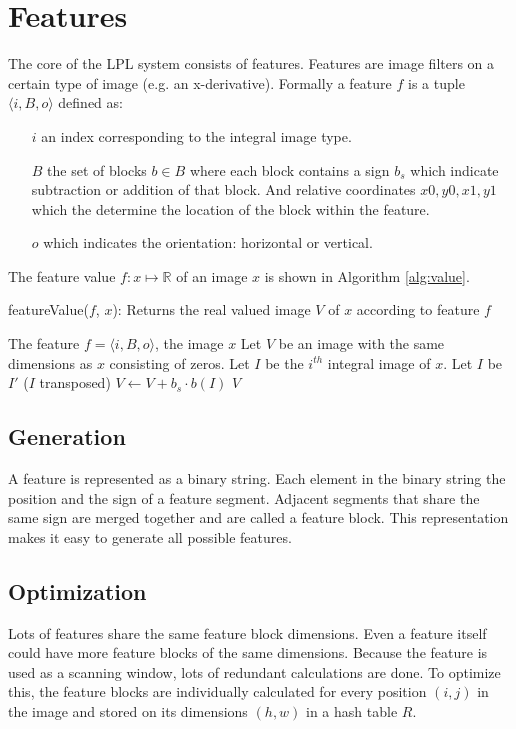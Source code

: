 \documentclass[a4paper,11pt]{article}
\begin{document}
\section*{Features}
The core of the LPL system consists of features. Features are image filters on
a certain type of image (e.g. an x-derivative). Formally a feature $f$ is a
tuple $\langle i, B, o \rangle$ defined as:
\begin{itemize}
	\item[$i$]{an index corresponding to the integral image type.}
	\item[$B$]{the set of blocks $b \in B$ where each block contains a sign
	$b_s$ which indicate subtraction or addition of that block. And relative
	coordinates $x0,y0,x1,y1$ which the determine the location of the block
	within the feature.}
	\item[$o$]{which indicates the orientation: horizontal or vertical.}
\end{itemize}
The feature value $f:x\mapsto\mathbb{R}$ of an image $x$ is shown in Algorithm
\ref{alg:value}.
\begin{algorithm}
	\caption{featureValue($f$, $x$): Returns the real valued image $V$ of $x$ according to feature $f$}
	\begin{algorithmic}[1]
	\REQUIRE The feature $f = \langle i, B, o \rangle$, the image $x$
	\medskip
	\STATE Let $V$ be an image with the same dimensions as $x$ consisting of zeros.
	\STATE Let $I$ be the $i^{th}$ integral image of $x$.
		\STATE Let $I$ be $I'$ ($I$ transposed)
	\ENDIF
		\STATE $V \leftarrow V + b_s \cdot b(I)$
	\ENDFOR
	\RETURN $V$
	\end{algorithmic}
\label{alg:value}
\end{algorithm}


\subsection*{Generation}
A feature is represented as a binary string. Each element in the binary string
the position and the sign of a feature segment. Adjacent segments that share
the same sign are merged together and are called a feature block. This
representation makes it easy to generate all possible features.

\subsection*{Optimization}
Lots of features share the same feature block dimensions. Even a feature
itself could have more feature blocks of the same dimensions. Because the
feature is used as a scanning window, lots of redundant calculations are done.
To optimize this, the feature blocks are individually calculated for every
position $(i,j)$ in the image and stored on its dimensions $(h,w)$ in a hash
table $R$.
\end{document}
